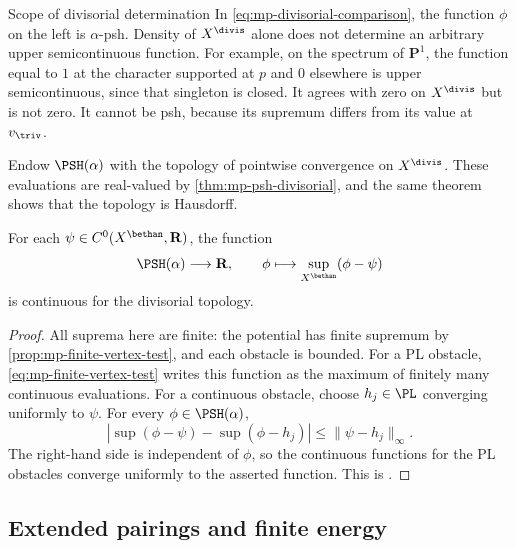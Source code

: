 \noindent\begin{minipage}{\linewidth}
\begin{warning}{Scope of divisorial determination}
\label{warn:mp-divisorial-determination}
In \eqref{eq:mp-divisorial-comparison}, the function $\phi$ on the left is $\alpha$-psh. Density of $X^{\divis}$ alone does not determine an arbitrary upper semicontinuous function. For example, on the spectrum of $\mathbf P^1$, the function equal to $1$ at the character supported at $p$ and $0$ elsewhere is upper semicontinuous, since that singleton is closed. It agrees with zero on $X^{\divis}$ but is not zero. It cannot be psh, because its supremum differs from its value at $v_{\triv}$.
\end{warning}
\end{minipage}\par

Endow $\PSH(\alpha)$ with the topology of pointwise convergence on $X^{\divis}$. These evaluations are real-valued by \cref{thm:mp-psh-divisorial}, and the same theorem shows that the topology is Hausdorff.

\begin{corollary}\label{cor:mp-obstacle-sup-continuity}
For each $\psi\in C^0(X^{\bethan},\mathbf R)$, the function
\[
        \PSH(\alpha)\longrightarrow\mathbf R,\qquad
        \phi\longmapsto\sup_{X^{\bethan}}(\phi-\psi)
\]
is continuous for the divisorial topology.
\end{corollary}

\begin{proof}
All suprema here are finite: the potential has finite supremum by \cref{prop:mp-finite-vertex-test}, and each obstacle is bounded. For a PL obstacle, \eqref{eq:mp-finite-vertex-test} writes this function as the maximum of finitely many continuous evaluations. For a continuous obstacle, choose $h_j\in\PL$ converging uniformly to $\psi$. For every $\phi\in\PSH(\alpha)$,
\[
 \left|\sup(\phi-\psi)-\sup(\phi-h_j)\right|
                  \leq\|\psi-h_j\|_\infty.
\]
The right-hand side is independent of $\phi$, so the continuous functions for the PL obstacles converge uniformly to the asserted function. This is \cite[Corollary~4.3.7, pp.~41--42]{MPTropicalV2}.
\end{proof}

\subsection{Extended pairings and finite energy}
\label{subsec:mp-psh-extended-pairings}

